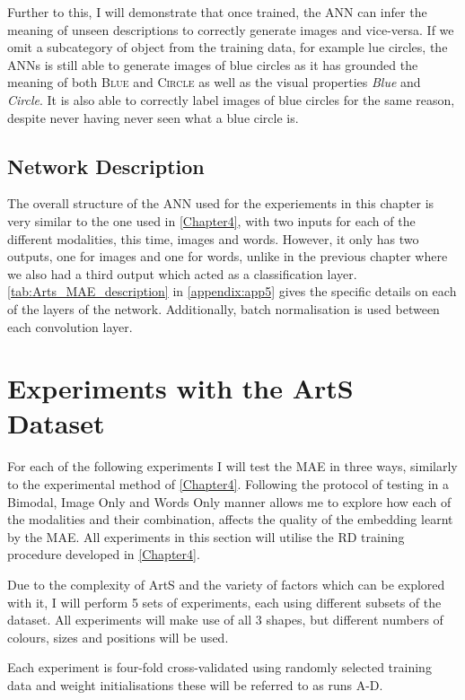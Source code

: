Further to this, I will demonstrate that once trained, the \ac{ANN} can infer the meaning of unseen descriptions to correctly generate images and vice-versa. If we omit a subcategory of object from the training data, for example lue circles, the \acp{ANN} is still able to generate images of blue circles as it has grounded the meaning of both \textsc{Blue} and \textsc{Circle} as well as the visual properties \textit{Blue} and \textit{Circle}. It is also able to correctly label images of blue circles for the same reason, despite never having never seen what a blue circle is.


\subsection{Network Description}
The overall structure of the \ac{ANN} used for the experiements in this chapter is very similar to the one used in \autoref{Chapter4}, with two inputs for each of the different modalities, this time, images and words. However, it only has two outputs, one for images and one for words, unlike in the previous chapter where we also had a third output which acted as a classification layer. \autoref{tab:Arts_MAE_description} in \autoref{appendix:app5} gives the specific details on each of the layers of the network. Additionally, batch normalisation is used between each convolution layer.



\section{Experiments with the ArtS Dataset}
For each of the following experiments I will test the \ac{MAE} in three ways, similarly to the experimental method of \autoref{Chapter4}. Following the protocol of testing in a Bimodal, Image Only and Words Only manner allows me to explore how each of the modalities and their combination, affects the quality of the embedding learnt by the \ac{MAE}. All experiments in this section will utilise the RD training procedure developed in \autoref{Chapter4}.


Due to the complexity of ArtS and the variety of factors which can be explored with it, I will perform 5 sets of experiments, each using different subsets of the dataset. All experiments will make use of all 3 shapes, but different numbers of colours, sizes and positions will be used.

Each experiment is four-fold cross-validated using randomly selected training data and weight initialisations these will be referred to as runs A-D.

